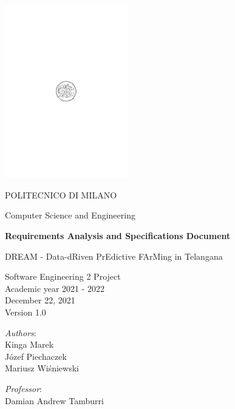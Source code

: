 \begin{titlingpage}
	\begin{center}
		\includegraphics[width=0.4\textwidth]{title_page/logo_polimi}
		
		\vspace{0.25cm}
		
		\LARGE POLITECNICO DI MILANO\\
		
		\vspace{0.2cm}
		
		\Large Computer Science and Engineering
		
		\vspace{0.8cm}
	
		\Huge \textbf{Requirements Analysis and Specifications Document}
		
		\vspace{0.5cm}
		\huge DREAM - Data-dRiven PrEdictive FArMing in Telangana
		
		\vspace{1.5cm}
		\LARGE Software Engineering 2 Project\\
		\Large Academic year 2021 - 2022\\
		\vspace{1cm}
		December 22, 2021\\
		Version 1.0
		\vspace{1cm}
		
		\large
		\begin{minipage}{.1\textwidth}
			\null
		\end{minipage}%
		\begin{minipage}{.4\textwidth}
			\textit{Authors}:\\
			Kinga Marek\\
            Józef Piechaczek\\
			Mariusz Wiśniewski
		\end{minipage}%
		\begin{minipage}{.4\textwidth}
			\raggedleft	
			\textit{Professor}:\\
			Damian Andrew Tamburri\\
			\phantom{placeholder}
		\end{minipage}%
		\begin{minipage}{.1\textwidth}
			\null
		\end{minipage}
		\end{center}
\end{titlingpage}